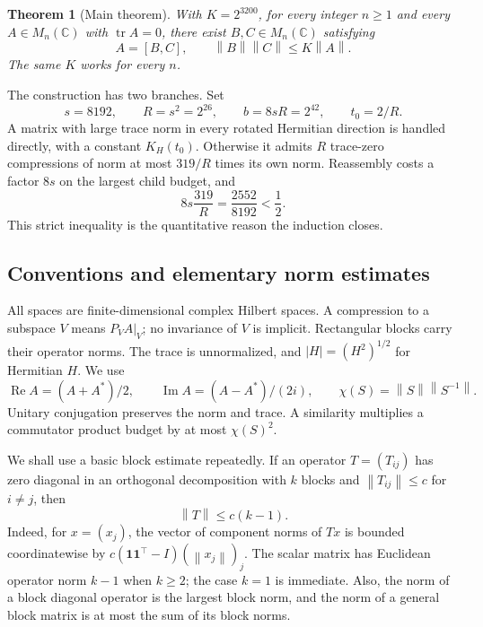 \documentclass[11pt]{article}
\newtheorem{theorem}{Theorem}[section]
\theoremstyle{remark}
\newcommand{\C}{\mathbb C}
\newcommand{\tr}{\operatorname{tr}}
\newcommand{\Rea}{\operatorname{Re}}
\newcommand{\Ima}{\operatorname{Im}}
\newcommand{\norm}[1]{\left\lVert#1\right\rVert}
\newcommand{\comm}[2]{[#1,#2]}
\numberwithin{equation}{section}
\begin{document}
\begin{theorem}[Main theorem]\label{thm:main}
With $K=2^{3200}$, for every integer $n\ge1$
and every $A\in M_n(\C)$ with $\tr A=0$, there exist $B,C\in M_n(\C)$ satisfying
\begin{equation}\label{eq:main}
 A=\comm BC,\qquad \norm B\norm C\le K\norm A.
\end{equation}
The same $K$ works for every $n$.
\end{theorem}

The construction has two branches. Set
\begin{equation}\label{eq:globalparameters}
 s=8192,\qquad R=s^2=2^{26},\qquad b=8sR=2^{42},\qquad t_0=2/R.
\end{equation}
A matrix with large trace norm in every rotated Hermitian direction is handled
directly, with a constant $K_H(t_0)$. Otherwise it admits $R$ trace-zero
compressions of norm at most $319/R$ times its own norm. Reassembly costs a factor
$8s$ on the largest child budget, and
\[
 8s\frac{319}{R}=\frac{2552}{8192}<\frac12.
\]
This strict inequality is the quantitative reason the induction closes.

\subsection{Conventions and elementary norm estimates}
All spaces are finite-dimensional complex Hilbert spaces. A compression to a
subspace $V$ means $P_VA|_V$; no invariance of $V$ is implicit. Rectangular blocks
carry their operator norms. The trace is unnormalized, and
$|H|=(H^2)^{1/2}$ for Hermitian $H$. We use
\[
 \Rea A=(A+A^*)/2,\qquad \Ima A=(A-A^*)/(2i),
 \qquad \chi(S)=\norm S\norm{S^{-1}}.
\]
Unitary conjugation preserves the norm and trace. A similarity multiplies a
commutator product budget by at most $\chi(S)^2$.

We shall use a basic block estimate repeatedly. If an operator $T=(T_{ij})$ has
zero diagonal in an orthogonal decomposition with $k$ blocks and
$\norm{T_{ij}}\le c$ for $i\ne j$, then
\begin{equation}\label{eq:offnorm}
 \norm T\le c(k-1).
\end{equation}
Indeed, for $x=(x_j)$, the vector of component norms of $Tx$ is bounded
coordinatewise by $c(\mathbf1\mathbf1^\top-I)(\norm{x_j})_j$. The scalar matrix
has Euclidean operator norm $k-1$ when $k\ge2$; the case $k=1$ is immediate.
Also, the norm of a block diagonal operator is the largest block norm, and the
norm of a general block matrix is at most the sum of its block norms.
\end{document}
